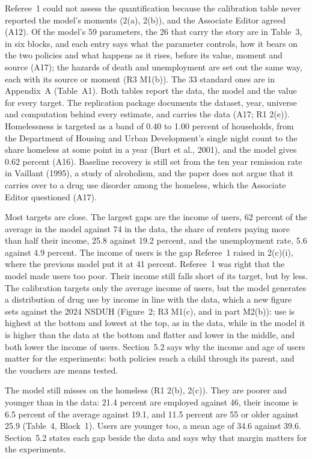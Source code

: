 \documentclass[11pt]{article}
\begin{document}
{\leavevmode\color{respred}%
Referee~1 could not assess the quantification because the calibration table never reported
the model's moments (2(a), 2(b)), and the Associate Editor agreed (A12). Of the model's 59
parameters, the 26 that carry the story are in Table~3, in six blocks, and each entry says what
the parameter controls, how it bears on the two policies and what happens as it rises, before
its value, moment and source (A17); the hazards of death and unemployment are set out the same
way, each with its source or moment (R3 M1(b)). The 33 standard ones are in Appendix~A
(Table~A1). Both tables report the data, the model and the value for every target. The
replication package documents the dataset, year, universe and computation behind every
estimate, and carries the data (A17; R1 2(e)). Homelessness is targeted as a band of 0.40 to
1.00 percent of households, from the Department of Housing and Urban Development's single
night count to the share homeless at some point in a year (Burt et al., 2001), and the model
gives 0.62 percent (A16). \open Baseline recovery is still set from the ten year remission rate
in Vaillant (1995), a study of alcoholism, and the paper does not argue that it carries over
to a drug use disorder among the homeless, which the Associate Editor questioned (A17).

Most targets are close. The largest gaps are the income of users, 62 percent of the average in
the model against 74 in the data, the share of renters paying more than half their income, 25.8
against 19.2 percent, and the unemployment rate, 5.6 against 4.9 percent. \concede The income of
users is the gap Referee~1 raised in 2(c)(i), where the previous model put it at 41 percent.
Referee~1 was right that the model made users too poor. Their income still falls short of its
target, but by less. The calibration targets only the average income of users, but the model generates a
distribution of drug use by income in line with the data, which a new figure sets against the
2024 NSDUH (Figure~2; R3 M1(c), and in part M2(b)): use is highest at the bottom and lowest at
the top, as in the data, while in the model it is higher than the data at the bottom and
flatter and lower in the middle, and both lower the income of users. Section~5.2 says why the
income and age of users matter for the experiments: both policies reach a child through its
parent, and the vouchers are means tested.

\open The model still misses on the homeless (R1 2(b), 2(c)). They are poorer and younger than
in the data: 21.4 percent are employed against 46, their income is 6.5 percent of the average
against 19.1, and 11.5 percent are 55 or older against 25.9 (Table~4, Block~1). Users are
younger too, a mean age of 34.6 against 39.6. Section~5.2 states each gap beside the data and
says why that margin matters for the experiments.

}
\end{document}
